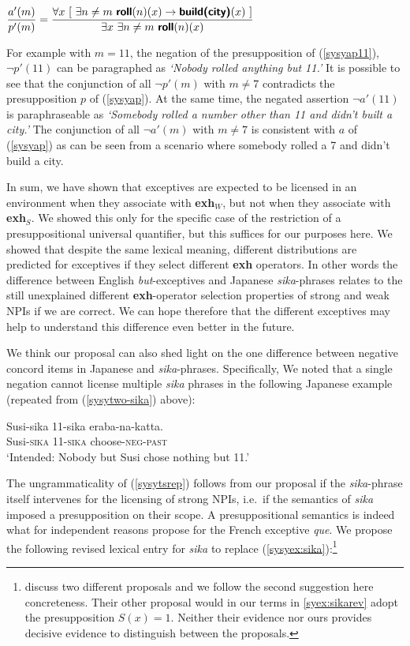 \documentclass[output=paper,colorlinks,citecolor=brown,
]{langscibook}
\def\refp#1{(\ref{sy#1})}
\def\M#1{\textsc{#1}}
\begin{document}
\ea \label{syap11}$\displaystyle \frac{a'(m)}{p'(m)} = 
\frac{\forall x\ [\ \exists n \neq m\  \textsf{\textbf{roll}}(n)(x)  \rightarrow \textsf{\textbf{build(city)}}(x)\ ]}{\exists x\  \exists n \neq m\  \textsf{\textbf{roll}}(n)(x)}$
\z

For example with $m = 11$, the negation of the presupposition of \refp{syap11}, $\neg p'(11)$ can be paragraphed as \emph{`Nobody rolled anything but 11.'}  It is possible to see that the conjunction of all $\neg p'(m)$ with $m \neq 7$ contradicts the presupposition $p$ of \refp{syap}.   At the same time, the negated assertion $\neg a'(11)$ is paraphraseable as \emph{`Somebody rolled a number other than 11 and didn't built a city.'} The conjunction of all $\neg a'(m)$ with $m \neq 7$ is consistent with $a$ of \refp{syap} as can be seen from a scenario where somebody rolled a 7 and didn't build a city.

In sum, we have shown that exceptives are expected to be licensed in an environment when they associate with \textbf{exh}$_W$, but not when they associate with \textbf{exh}$_S$.  We showed this only for the specific case of the restriction of a presuppositional universal quantifier, but this suffices for our purposes here.  We showed that despite the same lexical meaning, different distributions are predicted for exceptives if they select different \textbf{exh} operators. 
In other words the difference between English \emph{but}-exceptives and Japanese \emph{sika}-phrases relates to the still unexplained different \textbf{exh}-operator selection properties of strong and weak NPIs if we are correct.  We can hope therefore that the different exceptives may help to understand this difference even better in the future.

We think our proposal can also shed light on the one difference between negative concord items in Japanese and \emph{sika}-phrases.  Specifically, We noted that a single negation cannot license multiple \emph{sika} phrases in the following Japanese example (repeated from \refp{sytwo-sika} above): 

\ea\label{sytsrep}
\gll *Susi-sika 11-sika eraba-na-katta.\\
Susi-\M{sika} 11-\M{sika} choose-\M{neg}-\M{past}\\
\trans `Intended: Nobody but Susi chose nothing but 11.'\z

The ungrammaticality of \refp{sytsrep} follows from our proposal if the \emph{sika}-phrase itself intervenes for the licensing of strong NPIs, i.e.\ if the semantics of \emph{sika} imposed a presupposition on their scope.  A presuppositional semantics is indeed what \cite[p.~461--2]{fintel07a} for independent reasons propose for the French exceptive \emph{que}. We propose the following revised lexical entry for \emph{sika} to replace  \refp{syex:sika}:\footnote{\cite{fintel07a} discuss two different proposals and we follow the second suggestion here concreteness. Their other proposal would in our terms in \ref{syex:sikarev} adopt the presupposition $S(x)=1$.  Neither their evidence nor ours provides decisive evidence to distinguish between the proposals.}
\end{document}
